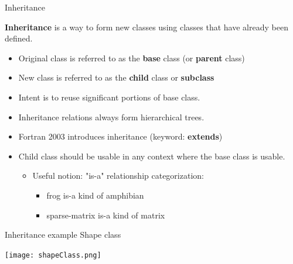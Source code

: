 \documentclass[11pt]{beamer}
\begin{document}
\begin{frame}{Inheritance}

\textbf{Inheritance} is a way to form new classes using classes that have already been defined.
\begin{itemize}

  \item Original class is referred to as the \textbf{base} class (or \textbf{parent} class)
  \item New class is referred to as the \textbf{child} class or \textbf{subclass}
  \item Intent is to reuse significant portions of base class.
  \item Inheritance relations always form hierarchical trees.
  \item Fortran 2003 introduces inheritance (keyword: \textbf{extends})
  \item Child class should be usable in any context where the base class is usable.
  \begin{itemize}
  \item Useful notion: "is-a" relationship categorization:
    \begin{itemize}
    \item frog is-a kind of amphibian
    \item sparse-matrix is-a kind of matrix
    \end{itemize}
  \end{itemize}
  
 \end{itemize}

\end{frame}


\begin{frame}{Inheritance example} 
Shape class
\begin{center} 
  \texttt{[image: shapeClass.png]} 
\end{center} 

\end{frame} 

\end{document}
